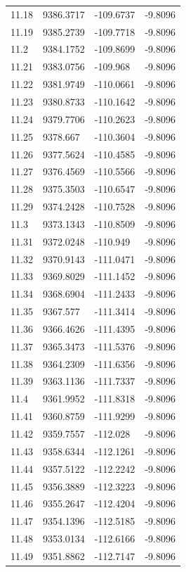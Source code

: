 \begin{table}[H]
\begin{tabular}{llll}
11.18 & 9386.3717 & -109.6737 & -9.8096 \\
11.19 & 9385.2739 & -109.7718 & -9.8096 \\
11.2 & 9384.1752 & -109.8699 & -9.8096 \\
11.21 & 9383.0756 & -109.968 & -9.8096 \\
11.22 & 9381.9749 & -110.0661 & -9.8096 \\
11.23 & 9380.8733 & -110.1642 & -9.8096 \\
11.24 & 9379.7706 & -110.2623 & -9.8096 \\
11.25 & 9378.667 & -110.3604 & -9.8096 \\
11.26 & 9377.5624 & -110.4585 & -9.8096 \\
11.27 & 9376.4569 & -110.5566 & -9.8096 \\
11.28 & 9375.3503 & -110.6547 & -9.8096 \\
11.29 & 9374.2428 & -110.7528 & -9.8096 \\
11.3 & 9373.1343 & -110.8509 & -9.8096 \\
11.31 & 9372.0248 & -110.949 & -9.8096 \\
11.32 & 9370.9143 & -111.0471 & -9.8096 \\
11.33 & 9369.8029 & -111.1452 & -9.8096 \\
11.34 & 9368.6904 & -111.2433 & -9.8096 \\
11.35 & 9367.577 & -111.3414 & -9.8096 \\
11.36 & 9366.4626 & -111.4395 & -9.8096 \\
11.37 & 9365.3473 & -111.5376 & -9.8096 \\
11.38 & 9364.2309 & -111.6356 & -9.8096 \\
11.39 & 9363.1136 & -111.7337 & -9.8096 \\
11.4 & 9361.9952 & -111.8318 & -9.8096 \\
11.41 & 9360.8759 & -111.9299 & -9.8096 \\
11.42 & 9359.7557 & -112.028 & -9.8096 \\
11.43 & 9358.6344 & -112.1261 & -9.8096 \\
11.44 & 9357.5122 & -112.2242 & -9.8096 \\
11.45 & 9356.3889 & -112.3223 & -9.8096 \\
11.46 & 9355.2647 & -112.4204 & -9.8096 \\
11.47 & 9354.1396 & -112.5185 & -9.8096 \\
11.48 & 9353.0134 & -112.6166 & -9.8096 \\
11.49 & 9351.8862 & -112.7147 & -9.8096 \\

\end{tabular}
\end{table}
